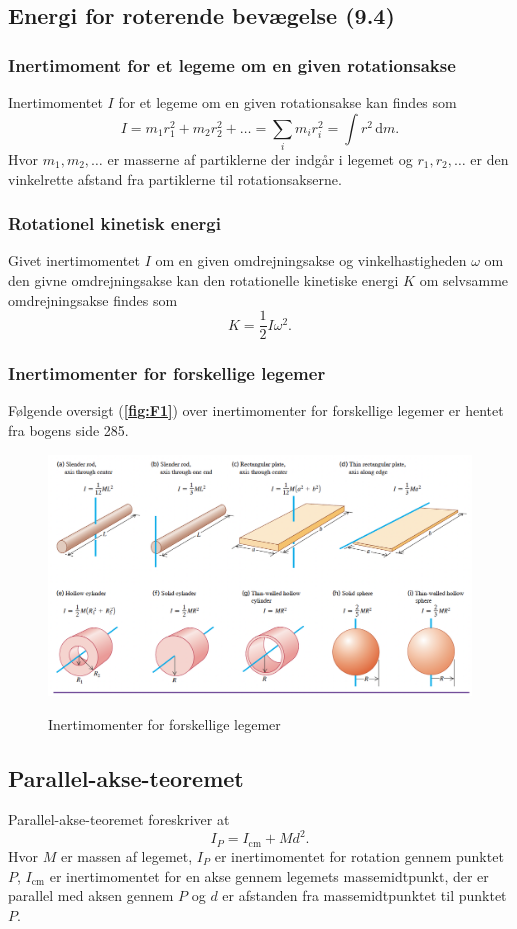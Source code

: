 \subsection{Energi for roterende bevægelse (9.4)}

\subsubsection{Inertimoment for et legeme om en given rotationsakse} \label{afs:inemomrot}
Inertimomentet $I$ for et legeme om en given rotationsakse kan findes som
\[ 
I = m_1 r_1^2 + m_2r_2^2 + \ldots  = \sum_i m_i r_i^2 = \int r^2 \, \mathrm{d}m
.\]
Hvor $m_1, m_2, \ldots $ er masserne af partiklerne der indgår i legemet og $r_1, r_2, \ldots$ er den vinkelrette afstand fra partiklerne til rotationsakserne.

\subsubsection{Rotationel kinetisk energi} \label{afs:erotkin}
Givet inertimomentet $I$ om en given omdrejningsakse og vinkelhastigheden $\omega$ om den givne omdrejningsakse kan den rotationelle kinetiske energi $K$ om selvsamme omdrejningsakse findes som
\[ 
K = \frac{1}{2} I \omega^2
.\]

\subsubsection{Inertimomenter for forskellige legemer} \label{afs:inemomforleg}
Følgende oversigt (\textbf{\autoref{fig:F1}}) over inertimomenter for forskellige legemer er hentet fra bogens side 285.
\begin{figure} [ht]
  \centering
  \caption{Inertimomenter for forskellige legemer}
  \includegraphics[width=0.8\linewidth]{../figures/F1.png}
  \label{fig:F1}
\end{figure}


\subsection{Parallel-akse-teoremet} \label{afs:parakstheo}
Parallel-akse-teoremet foreskriver at
\[ 
I_{P} = I_{\text{cm}} + Md^2
.\]
Hvor $M$ er massen af legemet, $I_{P}$ er inertimomentet for rotation gennem punktet $P$, $I_{\text{cm}}$ er inertimomentet for en akse gennem legemets massemidtpunkt, der er parallel med aksen gennem $P$ og $d$ er afstanden fra massemidtpunktet til punktet $P$.
